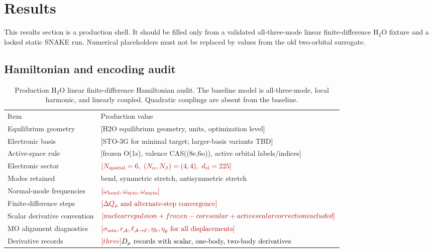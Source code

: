 \documentclass[
  reprint,
  amsmath,
  amssymb,
  aps,
  pra,
  nofootinbib,
  superscriptaddress,
  floatfix
]{revtex4-2}
\newcommand{\placeholder}[1]{\textcolor{red!70!black}{\ifmmode\left[#1\right]\else\textsf{[#1]}\fi}}
\newcommand{\Acal}{\mathcal{A}}
\newcommand{\Ecal}{\mathcal{E}}
\newcommand{\el}{\mathrm{el}}
\newcommand{\HtwoO}{\mathrm{H_2O}}
\begin{document}
\section{Results}
\label{sec:results}

This results section is a production shell.  It should be filled only from a validated all-three-mode linear finite-difference \(\HtwoO\) fixture and a locked static SNAKE run.  Numerical placeholders must not be replaced by values from the old two-orbital surrogate.

\subsection{Hamiltonian and encoding audit}

\begin{table}[t]
\caption{\label{tab:h2o_model_audit}Production \(\HtwoO\) linear finite-difference Hamiltonian audit.  The baseline model is all-three-mode, local harmonic, and linearly coupled.  Quadratic couplings are absent from the baseline.}
\begin{ruledtabular}
\begin{tabular*}{\textwidth}{@{\extracolsep{\fill}}ll}
Item & Production value \\
\colrule
Equilibrium geometry & \placeholder{H2O equilibrium geometry, units, optimization level} \\
Electronic basis & \placeholder{STO-3G for minimal target; larger-basis variants TBD} \\
Active-space rule & \placeholder{frozen O(1s), valence CAS((8e,6o)), active orbital labels/indices} \\
Electronic sector & \(\placeholder{N_{\rm spatial}=6,\ (N_\alpha,N_\beta)=(4,4),\ d_{\el}=225}\) \\
Modes retained & bend, symmetric stretch, antisymmetric stretch \\
Normal-mode frequencies & \(\placeholder{\omega_{\rm bend},\omega_{\rm sym},\omega_{\rm asym}}\) \\
Finite-difference steps & \(\placeholder{\Delta Q_\mu\text{ and alternate-step convergence}}\) \\
Scalar derivative convention & \(\placeholder{nuclear repulsion + frozen-core scalar + active scalar correction included}\) \\
MO alignment diagnostics & \(\placeholder{\sigma_{\min},r_{\Acal},\ell_{\Acal\to\Ecal},\eta_h,\eta_g\text{ for all displacements}}\) \\
Derivative records & \(\placeholder{three }D_\mu\text{ records with scalar, one-body, two-body derivatives}\) \\

\end{tabular*}
\end{ruledtabular}
\end{table}
\end{document}
